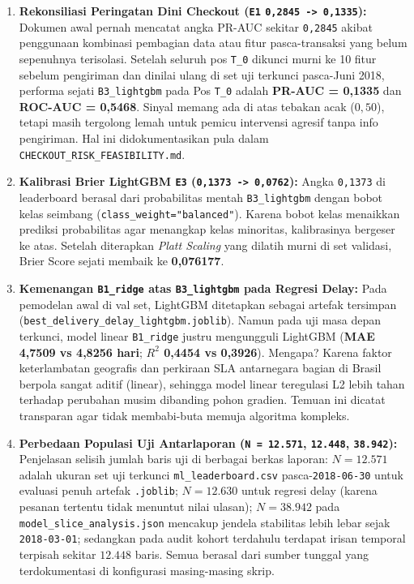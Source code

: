 \documentclass[11pt,a4paper,oneside]{book}
\newcommand{\code}[1]{{\small\nolinkurl{#1}}}
\begin{document}
\begin{kejujuranbox}
\begin{enumerate}
  \item \textbf{Rekonsiliasi Peringatan Dini Checkout (\code{E1} \code{0,2845 -> 0,1335}):} Dokumen awal pernah mencatat angka PR-AUC sekitar \code{0,2845} akibat penggunaan kombinasi pembagian data atau fitur pasca-transaksi yang belum sepenuhnya terisolasi. Setelah seluruh pos \code{T_0} dikunci murni ke 10 fitur sebelum pengiriman dan dinilai ulang di set uji terkunci pasca-Juni 2018, performa sejati \code{B3_lightgbm} pada Pos \code{T_0} adalah \textbf{PR-AUC = 0,1335} dan \textbf{ROC-AUC = 0,5468}. Sinyal memang ada di atas tebakan acak ($0{,}50$), tetapi masih tergolong lemah untuk pemicu intervensi agresif tanpa info pengiriman. Hal ini didokumentasikan pula dalam \code{CHECKOUT_RISK_FEASIBILITY.md}.
  \item \textbf{Kalibrasi Brier LightGBM \code{E3} (\code{0,1373 -> 0,0762}):} Angka \code{0,1373} di leaderboard berasal dari probabilitas mentah \code{B3_lightgbm} dengan bobot kelas seimbang (\code{class_weight="balanced"}). Karena bobot kelas menaikkan prediksi probabilitas agar menangkap kelas minoritas, kalibrasinya bergeser ke atas. Setelah diterapkan \emph{Platt Scaling} yang dilatih murni di set validasi, Brier Score sejati membaik ke \textbf{0,076177}.
  \item \textbf{Kemenangan \code{B1_ridge} atas \code{B3_lightgbm} pada Regresi Delay:} Pada pemodelan awal di val set, LightGBM ditetapkan sebagai artefak tersimpan (\code{best_delivery_delay_lightgbm.joblib}). Namun pada uji masa depan terkunci, model linear \code{B1_ridge} justru mengungguli LightGBM (\textbf{MAE 4,7509 vs 4,8256 hari}; \textbf{$R^2$ 0,4454 vs 0,3926}). Mengapa? Karena faktor keterlambatan geografis dan perkiraan SLA antarnegara bagian di Brasil berpola sangat aditif (linear), sehingga model linear teregulasi L2 lebih tahan terhadap perubahan musim dibanding pohon gradien. Temuan ini dicatat transparan agar tidak membabi-buta memuja algoritma kompleks.
  \item \textbf{Perbedaan Populasi Uji Antarlaporan (\code{N = 12.571}, \code{12.448}, \code{38.942}):} Penjelasan selisih jumlah baris uji di berbagai berkas laporan: $N = 12.571$ adalah ukuran set uji terkunci \code{ml_leaderboard.csv} pasca-\code{2018-06-30} untuk evaluasi penuh artefak \code{.joblib}; $N = 12.630$ untuk regresi delay (karena pesanan tertentu tidak menuntut nilai ulasan); $N = 38.942$ pada \code{model_slice_analysis.json} mencakup jendela stabilitas lebih lebar sejak \code{2018-03-01}; sedangkan pada audit kohort terdahulu terdapat irisan temporal terpisah sekitar $12.448$ baris. Semua berasal dari sumber tunggal yang terdokumentasi di konfigurasi masing-masing skrip.
\end{enumerate}
\end{kejujuranbox}
\end{document}
